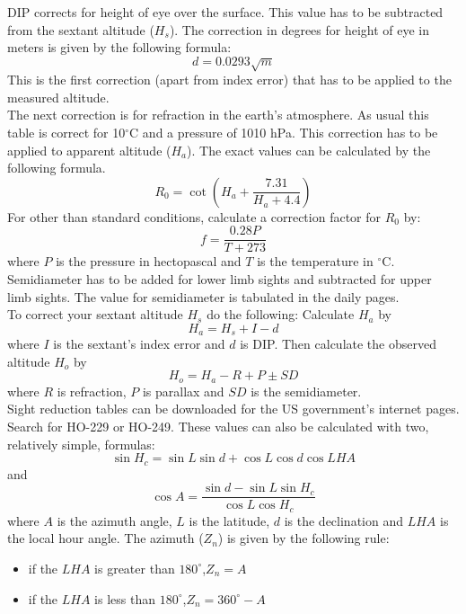 \documentclass[10pt, a4paper]{report}
\begin{document}
    \setcounter{page}{2}    %
    \vspace*{2cm}
    \noindent
    DIP corrects for height of eye over the surface. This value has to be subtracted from the sextant altitude ($H_s$). The  correction in degrees for height of eye in meters is given by the following formula: 
    \[d=0.0293\sqrt{m}\]
    This is the first correction (apart from index error) that has to be applied to the measured altitude.\\[12pt]
    \noindent
    The next correction is for refraction in the earth's atmosphere. As usual this table is correct for 10$^\circ$C and a pressure of 1010 hPa. This correction has to be applied to apparent altitude ($H_a$). The exact values can be calculated by the following formula.
    \[R_0=\cot \left( H_a + \frac{7.31}{H_a+4.4}\right)\]
    For other than standard conditions, calculate a correction factor for $R_0$ by: \[f=\frac{0.28P}{T+273}\] where $P$ is the pressure in hectopascal and $T$ is the temperature in $^\circ$C.\\[12pt]
    \noindent
    Semidiameter has to be added for lower limb sights and subtracted for upper limb sights. The value for semidiameter is tabulated in the daily pages.\\[12pt]
    \noindent
    To correct your sextant altitude $H_s$ do the following:
    Calculate $H_a$ by
     \[H_a= H_s+I-d\] 
    where $I$ is the sextant's index error and $d$ is DIP. Then calculate the observed altitude $H_o$ by
    \[H_o= H_a-R+P\pm SD\]
    where $R$ is refraction, $P$ is parallax and $SD$ is the semidiameter.\\[12pt]
    \noindent
    Sight reduction tables can be downloaded for the US government's internet pages. Search for HO-229 or HO-249.  These values can also be calculated with two, relatively simple, formulas:
    \[ \sin H_c= \sin L \sin d + \cos L \cos d \cos LHA\]
    and
    \[\cos A = \frac{\sin d - \sin L \sin H_c}{\cos L \cos H_c}\]
    where $A$ is the azimuth angle, $L$ is the latitude, $d$ is the declination and $LHA$ is the local hour angle. The azimuth ($Z_n$) is given by the following rule:
    \begin{itemize}
    \item if the $LHA$ is greater than $180^\circ$,\quad$Z_n=A$
    \item if the $LHA$ is less than $180^\circ$,\quad$Z_n = 360^\circ - A$
    \end{itemize}
\restoregeometry    %
\end{document}
